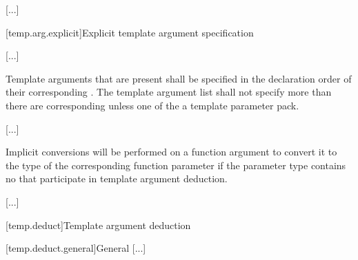\documentclass{wg21}
\begin{document}
\textcolor{noteclr}{[...]}

[temp.arg.explicit]{Explicit template argument specification}

\textcolor{noteclr}{[...]}

\pnum
Template arguments that are present shall be specified in the declaration
order of their corresponding
.
The template argument list shall not specify more
than there are corresponding
unless one of the   a template
parameter pack.
\begin{example}
    \textcolor{noteclr}{[...]}
\end{example}

\pnum
Implicit conversions will be performed on a function argument
to convert it to the type of the corresponding function parameter if
the parameter type contains no
that participate in template argument deduction.
\begin{note}
    \textcolor{noteclr}{[...]}
\end{note}

[temp.deduct]{Template argument deduction}

[temp.deduct.general]{General}
\textcolor{noteclr}{[...]}
\end{document}
